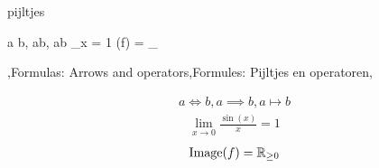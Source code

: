 \begin{saveblock}{pijltjes}
	\begin{highlightblock}[gobble=8]
		\DeclareMathOperator{\Image}{Image}

		a \iff b, a\implies b, a\mapsto b
		\lim_{x} = 1
		\Image(f) = _{}
	\end{highlightblock}
\end{saveblock}


\begin{frame}
	{\lang,Formulas: Arrows and operators,Formules: Pijltjes en operatoren,}


	\vspace{-10pt}
	\begin{align*}
		a \iff b, a\implies b, a\mapsto b
	\end{align*}
	\begin{align*}
		\lim_{x\to 0}\frac{\sin(x)}{x} = 1
	\end{align*}
	\begin{align*}
		\Image(f) = \mathbb{R}_{\geq 0}
	\end{align*}
\end{frame}
